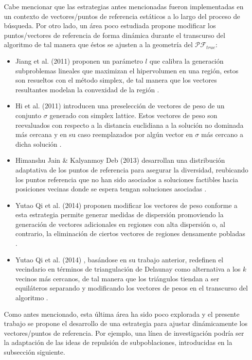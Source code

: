 \documentclass[letterpaper,10pt]{article}
\begin{document}
Cabe mencionar que las estrategias antes mencionadas fueron implementadas en un contexto de vectores/puntos de referencia estáticos a lo largo del proceso de búsqueda. Por otro lado, un área poco estudiada propone modificar los puntos/vectores de referencia de forma dinámica durante el transcurso del algoritmo de tal manera que éstos se ajusten a la geometría del $\mathcal{PF}_{true}$:
\begin{itemize}
  \item Jiang et al. (2011) proponen un parámetro $l$ que calibra la generación subproblemas lineales que maximizan el hipervolumen en una región, estos son resueltos con el método simplex, de tal manera que los vectores resultantes modelan la convexidad de la región \cite{jiang2011multiobjective}.
  \item Hi et al. (2011) introducen una preselección de vectores de peso de un conjunto $\sigma$  generado con simplex lattice. Estos vectores de peso son reevaluados con respecto  a la distancia euclidiana  a la solución no dominada más cercana y en su caso reemplazados por algún vector en $\sigma$ más cercano a dicha solución \cite{li2011adaptive}.
  \item Himanshu Jain \& Kalyanmoy Deb (2013) desarrollan una distribución adaptativa de los puntos de referencia para asegurar la diversidad, reubicando los puntos referencia que no han sido asociados a soluciones factibles hacia posiciones vecinas donde se espera tengan soluciones asociadas \cite{jain2013improved}.
  \item Yutao Qi et al. (2014) proponen modificar los vectores de peso conforme a esta estrategia permite generar medidas de dispersión promoviendo la generación de vectores adicionales en regiones con alta dispersión o, al contrario, la eliminación de ciertos vectores de regiones densamente pobladas \cite{doi:10.1162/EVCOa00109}.
  \item Yutao Qi et al. (2014) , basándose en su trabajo anterior, redefinen el vecindario en términos de triangulación de Delaunay como alternativa a los $k$ vecinos más cercanos, de tal manera que los triángulos tiendan a ser equiláteros separando y modificando los vectores de pesos en el transcurso del algoritmo \cite{qi2014moea}.
\end{itemize}

Como antes mencionado, esta última área ha sido poco explorada y el presente trabajo se propone el desarrollo de una estrategia para ajustar dinámicamente los vectores/puntos de referencia. Por ejemplo, una línea de investigación podría ser la adaptación de las ideas de repulsión de subpoblaciones, introducidas en la subsección siguiente.
\end{document}
